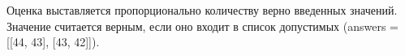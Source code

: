 \solutionSection

\markSection

Оценка выставляется пропорционально количеству верно введенных значений. Значение считается верным, если оно входит в список допустимых (answers = [[44, 43], [43, 42]]). 

